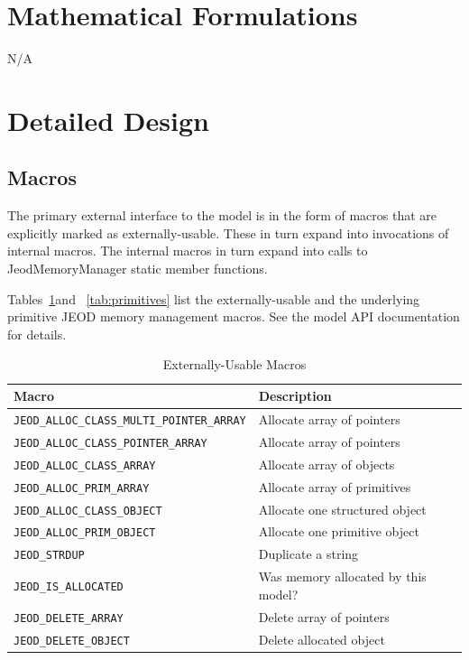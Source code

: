 \section{Mathematical Formulations}
N/A

\section{Detailed Design}
\label{sec:detailed_design}

\subsection{\ModelDesc Macros}
\label{sec:macros}
The primary external interface to the model is in the form of macros
that are explicitly marked as externally-usable. These in turn expand into
invocations of internal macros. The internal macros in turn expand into
calls to JeodMemoryManager static member functions.

Tables~\ref{tab:ext_macros}and ~\ref{tab:primitives} list the externally-usable and the underlying primitive JEOD memory management macros.
See the model API documentation for details.

\begin{table}[htp]
\centering
\caption{Externally-Usable \ModelDesc Macros}
\label{tab:ext_macros}
\vspace{1ex}
\begin{tabular}{||l|l|} \hline
{\bf Macro} & {\bf Description} \\ \hline \hline
\verb|JEOD_ALLOC_CLASS_MULTI_POINTER_ARRAY| & Allocate array of pointers \\
\verb|JEOD_ALLOC_CLASS_POINTER_ARRAY|       & Allocate array of pointers \\
\verb|JEOD_ALLOC_CLASS_ARRAY|               & Allocate array of objects \\
\verb|JEOD_ALLOC_PRIM_ARRAY|                & Allocate array of primitives \\
\verb|JEOD_ALLOC_CLASS_OBJECT|              & Allocate one structured object \\
\verb|JEOD_ALLOC_PRIM_OBJECT|               & Allocate one primitive object \\
\verb|JEOD_STRDUP|                          & Duplicate a string \\
\verb|JEOD_IS_ALLOCATED|                    & Was memory allocated by this model? \\
\verb|JEOD_DELETE_ARRAY|                    & Delete array of pointers \\
\verb|JEOD_DELETE_OBJECT|                   & Delete allocated object \\
\hline
\end{tabular}
\end{table}

